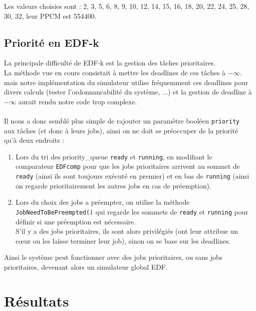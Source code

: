 \documentclass[a4paper,10pt]{article}
\begin{document}
		Les valeurs choisies sont : {2, 3, 5, 6, 8, 9, 10, 12, 14, 15, 16, 18, 20, 22, 24, 25, 28, 30, 32}, leur PPCM est 554400.

	\subsection{Priorité en EDF-k}\hypertarget{prioriteEDFk}{}

		La principale difficulté de EDF-k est la gestion des tâches prioritaires.\\
		La méthode vue en cours consistait à mettre les deadlines de ces tâches à $- \infty$. mais notre implémentation du simulateur utilise fréquemment ces deadlines pour divers calculs (tester l'ordonnancabilité du système, ...) et la gestion de deadline à $- \infty$ aurait rendu notre code trop complexe.\\
		~\\
		Il nous a donc semblé plus simple de rajouter un paramètre booléen \verb?priority? aux tâches (et donc à leurs jobs), ainsi on ne doit se préoccuper de la priorité qu'à deux endroits :
		\begin{enumerate}
			\item Lors du tri des priority\_queue \verb?ready? et \verb?running?, en modifiant le comparateur \verb?EDFcomp? pour que les jobs prioritaires arrivent au sommet de \verb?ready? (ainsi ils sont toujours exécuté en premier) et en bas de \verb?running? (ainsi on regarde prioritairement les autres jobs en cas de préemption).\\
			\item Lors du choix des jobs a préempter, on utilise la méthode \verb?JobNeedToBePreempted()? qui regarde les sommets de \verb?ready? et \verb?running? pour définir si une préemption est nécessaire.\\
				S'il y a des jobs prioritaires, ils sont alors privilégiés (ont leur attribue un cœur ou les laisse terminer leur job), sinon on se base sur les deadlines.
		\end{enumerate}
		Ainsi le système peut fonctionner avec des jobs prioritaires, ou sans jobs prioritaires, devenant alors un simulateur global EDF.

\section{Résultats}
\end{document}

